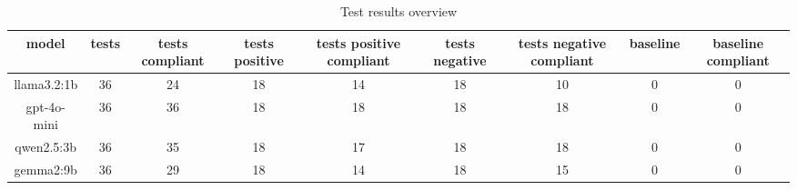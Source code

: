 
  \begin{table}[h!]
  \centering
  \begin{tabular}{|c|c|c|c|c|c|c|c|c|}
  \hline
  model & tests & tests compliant & tests positive & tests positive compliant & tests negative & tests negative compliant & baseline & baseline compliant \\
  \hline
  llama3.2:1b & 36 & 24 & 18 & 14 & 18 & 10 & 0 & 0\\
\hline
gpt-4o-mini & 36 & 36 & 18 & 18 & 18 & 18 & 0 & 0\\
\hline
qwen2.5:3b & 36 & 35 & 18 & 17 & 18 & 18 & 0 & 0\\
\hline
gemma2:9b & 36 & 29 & 18 & 14 & 18 & 15 & 0 & 0
  \end{tabular}
  \caption{Test results overview}
  
  \end{table}
  